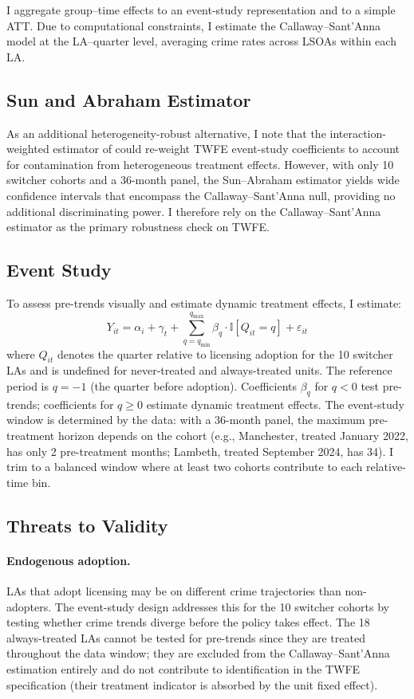 \documentclass[12pt]{article}
\newcommand{\ind}{\mathbb{I}}
\begin{document}
I aggregate group--time effects to an event-study representation and to a simple ATT. Due to computational constraints, I estimate the Callaway--Sant'Anna model at the LA--quarter level, averaging crime rates across LSOAs within each LA.

\subsection{Sun and Abraham Estimator}

As an additional heterogeneity-robust alternative, I note that the interaction-weighted estimator of \citet{sun2021} could re-weight TWFE event-study coefficients to account for contamination from heterogeneous treatment effects. However, with only 10 switcher cohorts and a 36-month panel, the Sun--Abraham estimator yields wide confidence intervals that encompass the Callaway--Sant'Anna null, providing no additional discriminating power. I therefore rely on the Callaway--Sant'Anna estimator as the primary robustness check on TWFE.

\subsection{Event Study}

To assess pre-trends visually and estimate dynamic treatment effects, I estimate:
\begin{equation}
Y_{it} = \alpha_i + \gamma_t + \sum_{q=q_{\min}}^{q_{\max}} \beta_q \cdot \ind[Q_{it} = q] + \varepsilon_{it}
\label{eq:eventstudy}
\end{equation}
where $Q_{it}$ denotes the quarter relative to licensing adoption for the 10 switcher LAs and is undefined for never-treated and always-treated units. The reference period is $q = -1$ (the quarter before adoption). Coefficients $\beta_q$ for $q < 0$ test pre-trends; coefficients for $q \geq 0$ estimate dynamic treatment effects. The event-study window is determined by the data: with a 36-month panel, the maximum pre-treatment horizon depends on the cohort (e.g., Manchester, treated January 2022, has only 2 pre-treatment months; Lambeth, treated September 2024, has 34). I trim to a balanced window where at least two cohorts contribute to each relative-time bin.

\subsection{Threats to Validity}

\paragraph{Endogenous adoption.} LAs that adopt licensing may be on different crime trajectories than non-adopters. The event-study design addresses this for the 10 switcher cohorts by testing whether crime trends diverge before the policy takes effect. The 18 always-treated LAs cannot be tested for pre-trends since they are treated throughout the data window; they are excluded from the Callaway--Sant'Anna estimation entirely and do not contribute to identification in the TWFE specification (their treatment indicator is absorbed by the unit fixed effect).
\end{document}
